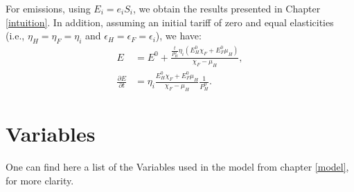 For emissions, using $E_i = e_i S_i$, we obtain the results presented in Chapter \ref{intuition}. In addition, assuming an initial tariff of zero and equal elasticities (i.e., $\eta_H = \eta_F = \eta_i$ and $\epsilon_H = \epsilon_F = \epsilon_i$), we have:
\begin{align*}
    E                             & = E^0 + \frac{\frac{t}{P_H^0} \eta_i (E_H^0 \chi_F + E_F^0 \mu_H)}{\chi_F - \mu_H}, \\[1mm]
    \frac{\partial E}{\partial t} & = \eta_i \frac{E_H^0 \chi_F + E_F^0 \mu_H}{\chi_F - \mu_H}\frac{1}{P_H^0}.
\end{align*}

\section{Variables}\label{appendix:Variables}

One can find here a list of the Variables used in the model from chapter \ref{model}, for more clarity.

